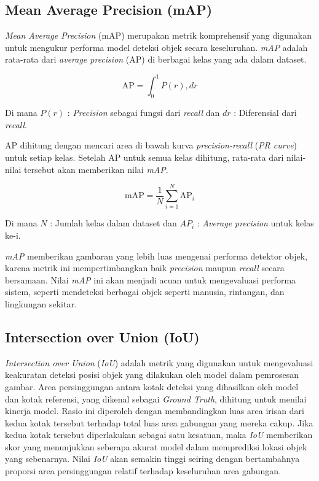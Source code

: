 \subsection{Mean Average Precision (mAP)}
\label{subsec:mAP}

\emph{Mean Average Precision} (mAP) merupakan metrik komprehensif yang digunakan untuk mengukur performa model deteksi objek secara keseluruhan. \emph{mAP} adalah rata-rata dari \emph{average precision} (AP) di berbagai kelas yang ada dalam dataset.

\begin{equation} 
  \mathrm{AP} = \int_0^1 P(r) , dr 
\end{equation}

Di mana \(P(r)\) : \emph{Precision} sebagai fungsi dari \emph{recall} dan \(dr\) : Diferensial dari \emph{recall}.

AP dihitung dengan mencari area di bawah kurva \emph{precision-recall} (\emph{PR curve}) untuk setiap kelas. Setelah AP untuk semua kelas dihitung, rata-rata dari nilai-nilai tersebut akan memberikan nilai \emph{mAP}.

\begin{equation} 
  \mathrm{mAP} = \frac{1}{N} \sum_{i=1}^{N} \mathrm{AP}_i 
\end{equation}

Di mana \(N\) : Jumlah kelas dalam dataset dan \(AP_i\) : \emph{Average precision} untuk kelas ke-i.

\emph{mAP} memberikan gambaran yang lebih luas mengenai performa detektor objek, karena metrik ini mempertimbangkan baik \emph{precision} maupun \emph{recall} secara bersamaan. Nilai \emph{mAP} ini akan menjadi acuan untuk mengevaluasi performa sistem, seperti mendeteksi berbagai objek seperti manusia, rintangan, dan lingkungan sekitar.

\subsection{Intersection over Union (IoU)}
\label{subsec:IoU}

\emph{Intersection over Union} (\emph{IoU}) adalah metrik yang digunakan untuk mengevaluasi keakuratan deteksi posisi objek yang dilakukan oleh model dalam pemrosesan gambar. Area persinggungan antara kotak deteksi yang dihasilkan oleh model dan kotak referensi, yang dikenal sebagai \emph{Ground Truth}, dihitung untuk menilai kinerja model. Rasio ini diperoleh dengan membandingkan luas area irisan dari kedua kotak tersebut terhadap total luas area gabungan yang mereka cakup. Jika kedua kotak tersebut diperlakukan sebagai satu kesatuan, maka \emph{IoU} memberikan skor yang menunjukkan seberapa akurat model dalam memprediksi lokasi objek yang sebenarnya. Nilai \emph{IoU} akan semakin tinggi seiring dengan bertambahnya proporsi area persinggungan relatif terhadap keseluruhan area gabungan.

